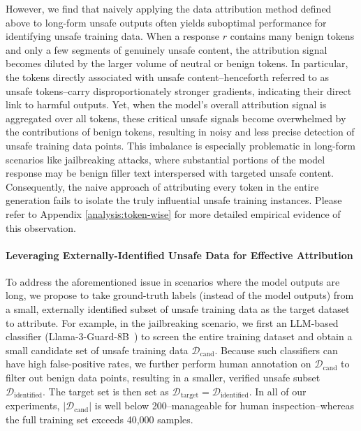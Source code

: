 \documentclass[11pt]{article}
\begin{document}
However, we find that naively applying the data attribution method defined above to long-form unsafe outputs often yields suboptimal performance for identifying unsafe training data. When a response $r$ contains many benign tokens and only a few segments of genuinely unsafe content, the attribution signal becomes diluted by the larger volume of neutral or benign tokens. In particular, the tokens directly associated with unsafe content--henceforth referred to as unsafe tokens--carry disproportionately stronger gradients, indicating their direct link to harmful outputs. Yet, when the model’s overall attribution signal is aggregated over all tokens, these critical unsafe signals become overwhelmed by the contributions of benign tokens, resulting in noisy and less precise detection of unsafe training data points. This imbalance is especially problematic in long-form scenarios like jailbreaking attacks, where substantial portions of the model response may be benign filler text interspersed with targeted unsafe content. Consequently, the naive approach of attributing every token in the entire generation fails to isolate the truly influential unsafe training instances. Please refer to Appendix \ref{analysis:token-wise} for more detailed empirical evidence of this observation.

\paragraph{Leveraging Externally-Identified Unsafe Data for Effective Attribution}

To address the aforementioned issue in scenarios where the model outputs are long, we propose to take ground-truth labels (instead of the model outputs) from a small, externally identified subset of unsafe training data as the target dataset to attribute. For example, in the jailbreaking scenario, we first an LLM-based classifier (Llama-3-Guard-8B~\citep{dubey2024llama3herdmodels}) to screen the entire training dataset and obtain a small candidate set of unsafe training data $\mathcal{D}_{\text{cand}}$. Because such classifiers can have high false-positive rates, we further perform human annotation on $\mathcal{D}_{\text{cand}}$ to filter out benign data points, resulting in a smaller, verified unsafe subset $\mathcal{D}_{\text{identified}}$. The target set is then set as $\mathcal{D}_{\text{target}} = \mathcal{D}_{\text{identified}}$. In all of our experiments, $|\mathcal{D}_{\text{cand}}|$ is well below 200--manageable for human inspection--whereas the full training set exceeds 40,000 samples.
\end{document}
